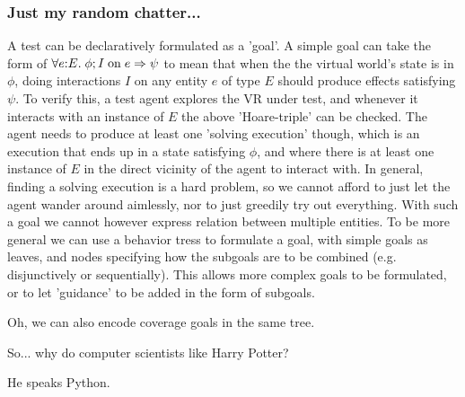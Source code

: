 \documentclass[sigplan]{acmart}\settopmatter{printfolios=false,printccs=false,printacmref=false}
\begin{document}
\subsubsection*{Just my random chatter...}

A test can be declaratively formulated as a 'goal'. A simple goal can take
the form of $\forall e{:}E. \; \phi ; I \; {\rm on} \; e \Rightarrow \psi$
to mean that when the the virtual world's state is in $\phi$, doing
interactions $I$ on any entity $e$ of type $E$ should produce effects
satisfying $\psi$. To verify this, a test agent explores the VR under test,
and whenever it interacts with an instance of $E$ the above 'Hoare-triple'
can be checked. The agent needs to produce at least one
'solving execution' though, which is an execution that ends up in a state
satisfying $\phi$, and where there is at least one instance of $E$
in the direct vicinity of the agent to interact with. In general, finding
a solving execution is a hard problem, so we cannot afford to just let
the agent wander around aimlessly, nor to just greedily try out everything.
With such a goal we cannot however express relation between multiple
entities. To be more general
we can use a behavior tress \cite{xxx} to formulate a goal, with simple goals
as leaves, and nodes specifying how the subgoals are to be combined
(e.g. disjunctively or sequentially). This allows more complex goals to be
formulated, or to let 'guidance' to be added in the form of subgoals.

Oh, we can also encode coverage goals in the same tree.

So... why do computer scientists like Harry Potter? 

He speaks Python.








 
\end{document}
